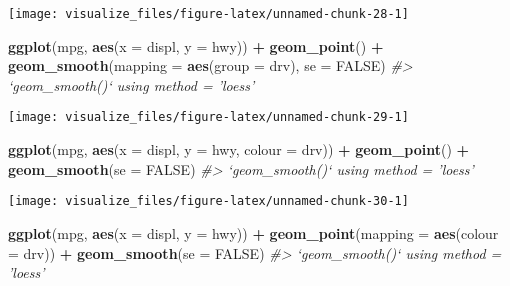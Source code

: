 \documentclass[]{book}
\newenvironment{Shaded}{\begin{snugshade}}{\end{snugshade}}
\newcommand{\CommentTok}[1]{\textcolor[rgb]{0.56,0.35,0.01}{\textit{#1}}}
\newcommand{\DataTypeTok}[1]{\textcolor[rgb]{0.13,0.29,0.53}{#1}}
\newcommand{\KeywordTok}[1]{\textcolor[rgb]{0.13,0.29,0.53}{\textbf{#1}}}
\newcommand{\NormalTok}[1]{#1}
\newcommand{\OperatorTok}[1]{\textcolor[rgb]{0.81,0.36,0.00}{\textbf{#1}}}
\newcommand{\OtherTok}[1]{\textcolor[rgb]{0.56,0.35,0.01}{#1}}
\newcommand{\StringTok}[1]{\textcolor[rgb]{0.31,0.60,0.02}{#1}}
\theoremstyle{definition}
\theoremstyle{definition}
\theoremstyle{definition}
\theoremstyle{remark}
\begin{document}
\begin{center}\texttt{[image: visualize\_files/figure-latex/unnamed-chunk-28-1]} \end{center}

\begin{Shaded}
\begin{Highlighting}[]
\KeywordTok{ggplot}\NormalTok{(mpg, }\KeywordTok{aes}\NormalTok{(}\DataTypeTok{x =}\NormalTok{ displ, }\DataTypeTok{y =}\NormalTok{ hwy)) }\OperatorTok{+}
\StringTok{  }\KeywordTok{geom_point}\NormalTok{() }\OperatorTok{+}
\StringTok{  }\KeywordTok{geom_smooth}\NormalTok{(}\DataTypeTok{mapping =} \KeywordTok{aes}\NormalTok{(}\DataTypeTok{group =}\NormalTok{ drv), }\DataTypeTok{se =} \OtherTok{FALSE}\NormalTok{)}
\CommentTok{#> `geom_smooth()` using method = 'loess'}
\end{Highlighting}
\end{Shaded}

\begin{center}\texttt{[image: visualize\_files/figure-latex/unnamed-chunk-29-1]} \end{center}

\begin{Shaded}
\begin{Highlighting}[]
\KeywordTok{ggplot}\NormalTok{(mpg, }\KeywordTok{aes}\NormalTok{(}\DataTypeTok{x =}\NormalTok{ displ, }\DataTypeTok{y =}\NormalTok{ hwy, }\DataTypeTok{colour =}\NormalTok{ drv)) }\OperatorTok{+}
\StringTok{  }\KeywordTok{geom_point}\NormalTok{() }\OperatorTok{+}
\StringTok{  }\KeywordTok{geom_smooth}\NormalTok{(}\DataTypeTok{se =} \OtherTok{FALSE}\NormalTok{)}
\CommentTok{#> `geom_smooth()` using method = 'loess'}
\end{Highlighting}
\end{Shaded}

\begin{center}\texttt{[image: visualize\_files/figure-latex/unnamed-chunk-30-1]} \end{center}

\begin{Shaded}
\begin{Highlighting}[]
\KeywordTok{ggplot}\NormalTok{(mpg, }\KeywordTok{aes}\NormalTok{(}\DataTypeTok{x =}\NormalTok{ displ, }\DataTypeTok{y =}\NormalTok{ hwy)) }\OperatorTok{+}
\StringTok{  }\KeywordTok{geom_point}\NormalTok{(}\DataTypeTok{mapping =} \KeywordTok{aes}\NormalTok{(}\DataTypeTok{colour =}\NormalTok{ drv)) }\OperatorTok{+}
\StringTok{  }\KeywordTok{geom_smooth}\NormalTok{(}\DataTypeTok{se =} \OtherTok{FALSE}\NormalTok{)}
\CommentTok{#> `geom_smooth()` using method = 'loess'}
\end{Highlighting}
\end{Shaded}
\end{document}

